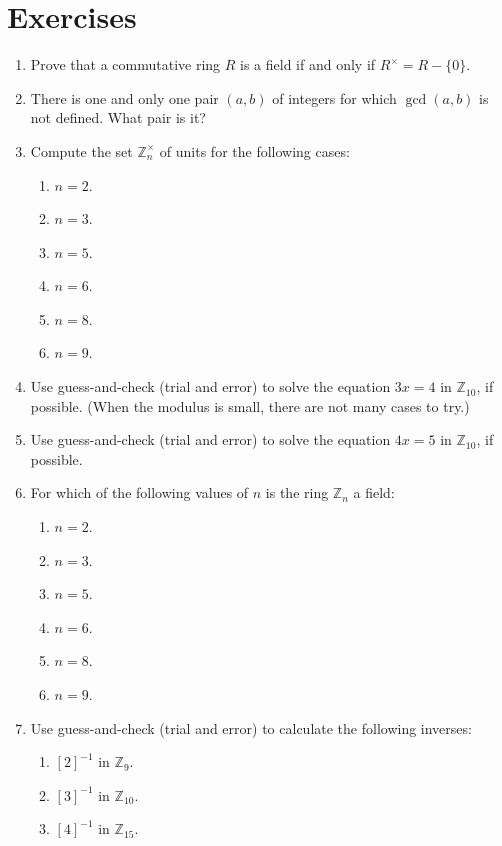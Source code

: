 \documentclass[11pt]{article}
\newenvironment{problems}
{
 \begin{enumerate}[topsep=1pt,itemsep=0pt,parsep=2pt,leftmargin=0.6cm,%
 label={\arabic*.}, ref=\arabic*] \small
}
{
 \end{enumerate}
}
\theoremstyle{definition}
\newcommand{\Z}{\mathbb{Z}} %
\begin{document}
\section*{Exercises}
\begin{problems}

\item Prove that a commutative ring $R$ is a field if and only if
  $R^\times = R-\{0\}$.

\item There is one and only one pair $(a,b)$ of integers for which
  $\gcd(a,b)$ is not defined. What pair is it?


\item Compute the set $\Z_n^\times$ of units for the following cases:
  \begin{multicols}{3}
  \begin{enumerate}[topsep=0pt,parsep=0pt]
  \item $n=2$.
  \item $n=3$.
  \item $n=5$.
  \item $n=6$.
  \item $n=8$.
  \item $n=9$.
  \end{enumerate}
  \end{multicols}

\item Use guess-and-check (trial and error) to solve the equation
  $3x=4$ in $\Z_{10}$, if possible. (When the modulus is small, there
  are not many cases to try.)

\item Use guess-and-check (trial and error) to solve the equation
  $4x=5$ in $\Z_{10}$, if possible.

\item For which of the following values of $n$ is the ring $\Z_n$ a
  field:
  \begin{multicols}{3}
  \begin{enumerate}[topsep=0pt,parsep=0pt]
  \item $n=2$.
  \item $n=3$.
  \item $n=5$.
  \item $n=6$.
  \item $n=8$.
  \item $n=9$.
  \end{enumerate}
  \end{multicols}

\item Use guess-and-check (trial and error) to calculate the following
  inverses:
  \begin{multicols}{3}
  \begin{enumerate}[topsep=0pt,parsep=0pt]
  \item $[2]^{-1}$ in $\Z_{9}$.
  \item $[3]^{-1}$ in $\Z_{10}$.
  \item $[4]^{-1}$ in $\Z_{15}$.
  \end{enumerate}
  \end{multicols}




\end{problems}
\end{document}
